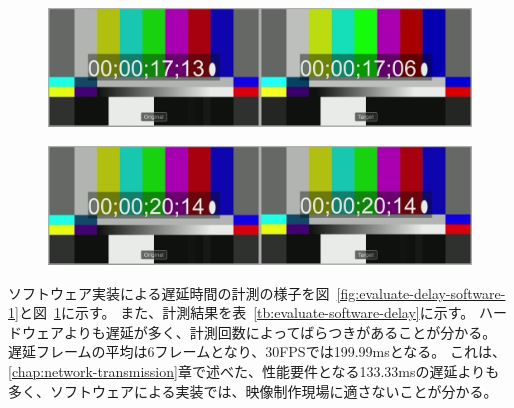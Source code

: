 \begin{figure}[htbp]
  \begin{center}
    \includegraphics[bb=0 0 1920 540,width=14cm]{img/evaluate-delay-software-2.png}
  \end{center}
  \caption[ソフトウェア実装による4回目の遅延計測のキャプチャー画像]{}
  \label{fig:evaluate-delay-software-2}
\end{figure}

\begin{figure}[htbp]
  \begin{center}
    \includegraphics[bb=0 0 1920 540,width=14cm]{img/evaluate-delay-hardware.png}
  \end{center}
  \caption[ハードウェア実装による遅延計測のキャプチャー画像]{}
  \label{fig:evaluate-delay-hardware}
\end{figure}


ソフトウェア実装による遅延時間の計測の様子を図~\ref{fig:evaluate-delay-software-1}と図~\ref{fig:evaluate-delay-software-2}に示す。
また、計測結果を表~\ref{tb:evaluate-software-delay}に示す。
ハードウェアよりも遅延が多く、計測回数によってばらつきがあることが分かる。
遅延フレームの平均は6フレームとなり、30FPSでは199.99msとなる。
これは、\ref{chap:network-transmission}章で述べた、性能要件となる133.33msの遅延よりも多く、ソフトウェアによる実装では、映像制作現場に適さないことが分かる。

